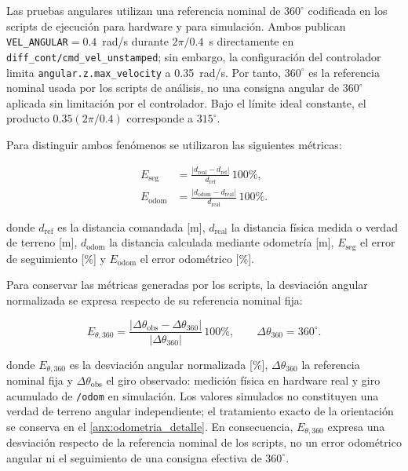 Las pruebas angulares utilizan una referencia nominal de $360^\circ$ codificada en los scripts de ejecución  para hardware y  para simulación. Ambos publican \texttt{VEL\_ANGULAR}$=0.4$~rad/s durante $2\pi/0.4$~s directamente en \texttt{diff\_cont/cmd\_vel\_unstamped}; sin embargo, la configuración del controlador  limita \texttt{angular.z.max\_velocity} a 0.35~rad/s. Por tanto, $360^\circ$ es la referencia nominal usada por los scripts de análisis, no una consigna angular de $360^\circ$ aplicada sin limitación por el controlador. Bajo el límite ideal constante, el producto $0.35(2\pi/0.4)$ corresponde a $315^\circ$.

Para distinguir ambos fenómenos se utilizaron las siguientes métricas:

\begin{align}
E_{\mathrm{seg}}
&=
\frac{
\left|d_{\mathrm{real}}-d_{\mathrm{ref}}\right|
}{
d_{\mathrm{ref}}
}\,100\%,
\label{eq:error_seguimiento}\\
E_{\mathrm{odom}}
&=
\frac{
\left|d_{\mathrm{odom}}-d_{\mathrm{real}}\right|
}{
d_{\mathrm{real}}
}\,100\%.
\label{eq:error_odometrico}
\end{align}

\noindent donde $d_{\mathrm{ref}}$ es la distancia comandada [m],
$d_{\mathrm{real}}$ la distancia física medida o verdad de terreno [m],
$d_{\mathrm{odom}}$ la distancia calculada mediante odometría [m],
$E_{\mathrm{seg}}$ el error de seguimiento [\%] y
$E_{\mathrm{odom}}$ el error odométrico [\%].

Para conservar las métricas generadas por los scripts, la desviación angular normalizada se expresa respecto de su referencia nominal fija:

\begin{equation}
E_{\theta,360}
=
\frac{
\left|
\Delta\theta_{\mathrm{obs}}
-
\Delta\theta_{360}
\right|
}{
\left|\Delta\theta_{360}\right|
}
\,100\%,
\qquad
\Delta\theta_{360}=360^\circ.
\label{eq:desviacion_angular_360}
\end{equation}

\noindent donde $E_{\theta,360}$ es la desviación angular normalizada [\%], $\Delta\theta_{360}$ la referencia nominal fija y $\Delta\theta_{\mathrm{obs}}$ el giro observado: medición física en hardware real y giro acumulado de \texttt{/odom} en simulación. Los valores simulados no constituyen una verdad de terreno angular
independiente; el tratamiento exacto de la orientación se conserva en el
\ref{anx:odometria_detalle}. En consecuencia, $E_{\theta,360}$ expresa una
desviación respecto de la referencia nominal de los scripts, no un error
odométrico angular ni el seguimiento de una consigna efectiva de
$360^\circ$.

